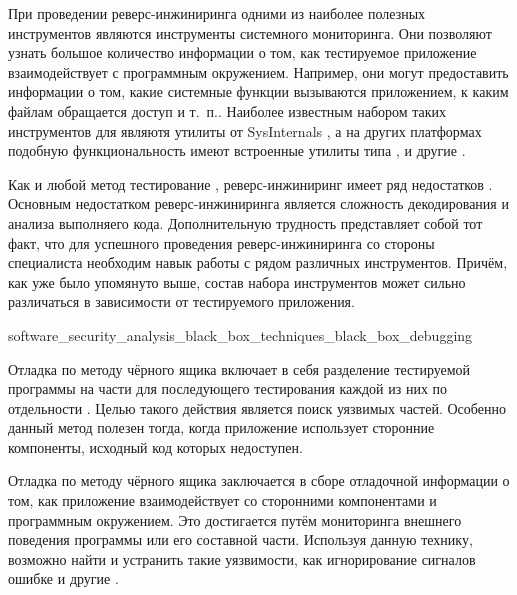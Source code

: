 %
При проведении реверс-инжиниринга одними из наиболее полезных инструментов являются инструменты 
системного мониторинга. 
%
Они позволяют узнать большое количество информации о том, как тестируемое приложение взаимодействует 
с программным окружением. 
%
Например, они могут предоставить информации о том, какие системные функции вызываются приложением, 
к каким файлам обращается доступ и т. п.. 
%
Наиболее известным набором таких инструментов для   
 являютя утилиты от SysInternals , а на других платформах 
подобную функциональность имеют встроенные утилиты типа ,  и другие 
.

%
Как и любой метод тестирование , реверс-инжиниринг имеет ряд недостатков 
. 
%
Основным недостатком реверс-инжиниринга является сложность декодирования и анализа выполняего кода. 
%
Дополнительную трудность представляет собой тот факт, что для успешного проведения 
реверс-инжиниринга со стороны специалиста необходим навык работы с рядом различных инструментов. 
%
Причём, как уже было упомянуто выше, состав набора инструментов может сильно различаться 
в зависимости от тестируемого приложения.


	{software_security_analysis_black_box_techniques_black_box_debugging}

%
Отладка по методу чёрного ящика включает в себя разделение тестируемой программы на части 
для последующего тестирования каждой из них по отдельности . 
%
Целью такого действия является поиск уязвимых частей. Особенно данный метод полезен тогда, 
когда приложение использует сторонние компоненты, исходный код которых недоступен.

%
Отладка по методу чёрного ящика заключается в сборе отладочной информации о том, как приложение 
взаимодействует со сторонними компонентами и программным окружением. 
%
Это достигается путём мониторинга внешнего поведения программы или его составной части. 
%
Используя данную технику, возможно найти и устранить такие уязвимости, как игнорирование сигналов 
ошибке и другие .

